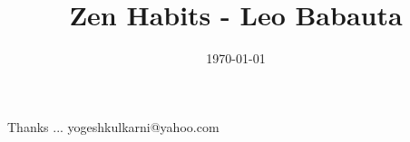 \documentclass[xcolor=dvipsnames,compress,t,pdf]{beamer}
\title[Zen Habits \hspace{4cm} \insertframenumber /\inserttotalframenumber]
{Zen Habits - Leo Babauta}
\subtitle[]{}
\date[2014]{\today}
\begin{document}
\begin{frame}
\titlepage
\end{frame}




\begin{frame}[c]{}
Thanks ...
\vspace{5mm}
yogeshkulkarni@yahoo.com
\end{frame}
\end{document}
